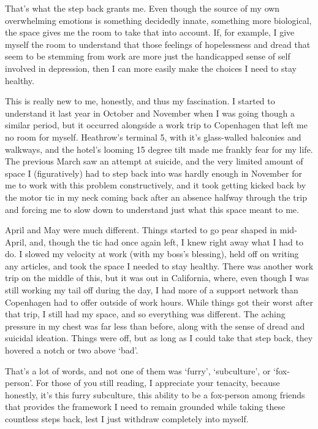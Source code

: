 That's what the step back grants me. Even though the source of my own overwhelming emotions is something decidedly innate, something more biological, the space gives me the room to take that into account. If, for example, I give myself the room to understand that those feelings of hopelessness and dread that seem to be stemming from work are more just the handicapped sense of self involved in depression, then I can more easily make the choices I need to stay healthy.

This is really new to me, honestly, and thus my fascination. I started to understand it last year in October and November when I was going though a similar period, but it occurred alongside a work trip to Copenhagen that left me no room for myself. Heathrow's terminal 5, with it's glass-walled balconies and walkways, and the hotel's looming 15 degree tilt made me frankly fear for my life. The previous March saw an attempt at suicide, and the very limited amount of space I (figuratively) had to step back into was hardly enough in November for me to work with this problem constructively, and it took getting kicked back by the motor tic in my neck coming back after an absence halfway through the trip and forcing me to slow down to understand just what this space meant to me.

April and May were much different. Things started to go pear shaped in mid-April, and, though the tic had once again left, I knew right away what I had to do. I slowed my velocity at work (with my boss's blessing), held off on writing any articles, and took the space I needed to stay healthy. There was another work trip on the middle of this, but it was out in California, where, even though I was still working my tail off during the day, I had more of a support network than Copenhagen had to offer outside of work hours. While things got their worst after that trip, I still had my space, and so everything was different. The aching pressure in my chest was far less than before, along with the sense of dread and suicidal ideation. Things were off, but as long as I could take that step back, they hovered a notch or two above `bad'.

That's a lot of words, and not one of them was `furry', `subculture', or `fox-person'. For those of you still reading, I appreciate your tenacity, because honestly, it's this furry subculture, this ability to be a fox-person among friends that provides the framework I need to remain grounded while taking these countless steps back, lest I just withdraw completely into myself.

